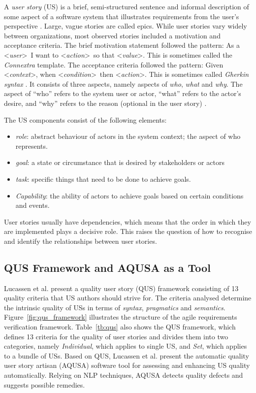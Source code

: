 A \emph{user story} (US) is a brief, semi-structured sentence and informal description of some aspect of a software system that illustrates requirements from the user’s perspective \cite{raharjana2021user}. Large, vague stories are called epics. While user stories vary widely between organizations, most observed stories included a motivation and acceptance criteria. The brief motivation statement followed the pattern:  As a  \textless\emph{user}\textgreater\ I want to \textless\emph{action}\textgreater\ so that \textless\emph{value}\textgreater. This is sometimes called the \emph{Connextra} template. The acceptance criteria followed the pattern: Given \textless\emph{context}\textgreater, when \textless\emph{condition}\textgreater \  then \textless\emph{action}\textgreater. This is sometimes called \emph{Gherkin syntax }\cite{wynne2017cucumber}. It consists of three aspects, namely aspects of \emph{who}, \emph{what} and \emph{why}. The aspect of \enquote{who} refers to the system user or actor, \enquote{what} refers to the actor’s desire, and \enquote{why} refers to the reason (optional in the user story) \cite{raharjana2021user}.

The US components consist of the following elements\cite{wautelet2017user}: 
\begin{itemize}
\item\emph{role}: abstract behaviour of actors in the system context; the aspect of who represents.
\item\emph{goal}: a state or circumstance that is desired by stakeholders or actors
\item\emph{task}: specific things that need to be done to achieve goals.
\item\emph{Capability}: the ability of actors to achieve goals based on certain conditions and events.
\end{itemize}

User stories usually have dependencies, which means that the order in which they are implemented plays a decisive role. This raises the question of how to recognise and identify the relationships between user stories.

\subsection{QUS Framework and AQUSA as a Tool}\label{quality-framework}
Lucassen et al. \cite{lucassen2016improving} present a quality user story (QUS) framework consisting of 13 quality criteria that US authors should strive for. The criteria analysed determine the intrinsic quality of USs in terms of \emph{syntax}, \emph{pragmatics} and \emph{semantics}. Figure~\ref{fig:qus_framework} illustrates the structure of the agile requirements verification framework. Table~\ref{tb:qus} also shows the QUS framework, which defines 13 criteria for the quality of user stories and divides them into two categories, namely \emph{Individual}, which applies to single US, and \emph{Set}, which applies to a bundle of USs. Based on QUS, Lucassen et al. present the automatic quality user story artisan (AQUSA) software tool for assessing and enhancing US quality automatically. Relying on NLP techniques, AQUSA detects quality defects and suggests possible remedies.

